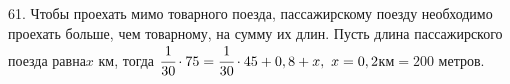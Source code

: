 61. Чтобы проехать мимо товарного поезда, пассажирскому поезду необходимо проехать больше, чем товарному, на сумму их длин. Пусть длина пассажирского поезда равна$x$ км, тогда $\cfrac{1}{30}\cdot75=\cfrac{1}{30}\cdot45+0,8+x,\ x=0,2$км$=200$ метров.\\
